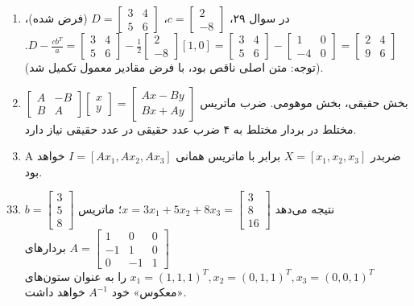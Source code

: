 \documentclass[12pt,a4paper]{article}
\begin{document}
{\begin{enumerate}
			\item در سوال ۲۹، $c = \begin{bmatrix} 2 \\ -8 \end{bmatrix}$، $D = \begin{bmatrix} 3 & 4 \\ 5 & 6 \end{bmatrix}$ (فرض شده)، $D - \frac{cb^T}{a} = \begin{bmatrix} 3 & 4 \\ 5 & 6 \end{bmatrix} - \frac{1}{2}\begin{bmatrix} 2 \\ -8 \end{bmatrix}[1,0] = \begin{bmatrix} 3 & 4 \\ 5 & 6 \end{bmatrix} - \begin{bmatrix} 1 & 0 \\ -4 & 0 \end{bmatrix} = \begin{bmatrix} 2 & 4 \\ 9 & 6 \end{bmatrix}$. (توجه: متن اصلی ناقص بود، با فرض مقادیر معمول تکمیل شد).
			
			\item $\begin{bmatrix} A & -B \\ B & A \end{bmatrix} \begin{bmatrix} x \\ y \end{bmatrix} = \begin{bmatrix} Ax-By \\ Bx+Ay \end{bmatrix}$ بخش حقیقی، بخش موهومی.
			ضرب ماتریس مختلط در بردار مختلط به ۴ ضرب عدد حقیقی در عدد حقیقی نیاز دارد.
			
			\item A ضربدر $X=[x_1, x_2, x_3]$ برابر با ماتریس همانی $I=[Ax_1, Ax_2, Ax_3]$ خواهد بود.
		\end{enumerate}
		
	
		\begin{enumerate}
			\setcounter{enumi}{32}
			\item $b = \begin{bmatrix} 3 \\ 5 \\ 8 \end{bmatrix}$ نتیجه می‌دهد $x = 3x_1 + 5x_2 + 8x_3 = \begin{bmatrix} 3 \\ 8 \\ 16 \end{bmatrix}$؛ ماتریس $A = \begin{bmatrix} 1 & 0 & 0 \\ -1 & 1 & 0 \\ 0 & -1 & 1 \end{bmatrix}$ بردارهای $x_1=(1,1,1)^T, x_2=(0,1,1)^T, x_3=(0,0,1)^T$ را به عنوان ستون‌های «معکوس» خود $A^{-1}$ خواهد داشت.
			

\end{enumerate}}
\end{document}
